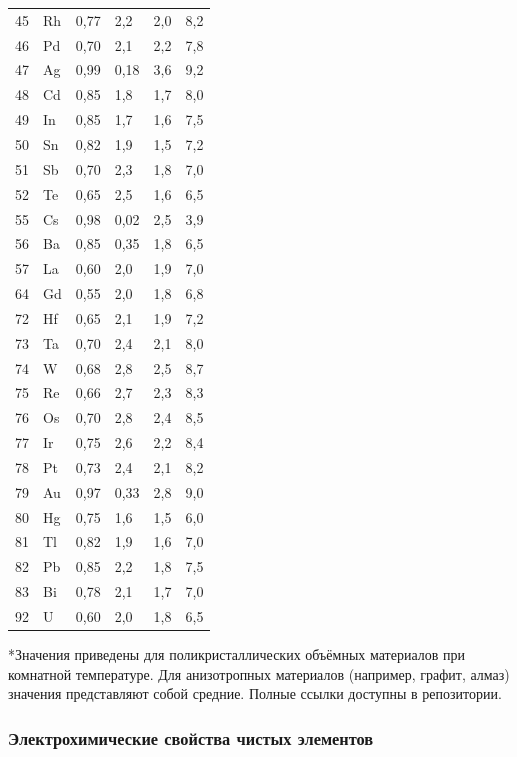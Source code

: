 \documentclass[12pt,a4paper]{article}
\begin{document}
\begin{longtable}{p{0.8cm}p{1.2cm}p{2.2cm}p{2.2cm}p{2.2cm}p{2.2cm}}
		45 & Rh & 0,77 & 2,2 & 2,0 & 8,2 \\
		46 & Pd & 0,70 & 2,1 & 2,2 & 7,8 \\
		47 & Ag & 0,99 & 0,18 & 3,6 & 9,2 \\
		48 & Cd & 0,85 & 1,8 & 1,7 & 8,0 \\
		49 & In & 0,85 & 1,7 & 1,6 & 7,5 \\
		50 & Sn & 0,82 & 1,9 & 1,5 & 7,2 \\
		51 & Sb & 0,70 & 2,3 & 1,8 & 7,0 \\
		52 & Te & 0,65 & 2,5 & 1,6 & 6,5 \\
		55 & Cs & 0,98 & 0,02 & 2,5 & 3,9 \\
		56 & Ba & 0,85 & 0,35 & 1,8 & 6,5 \\
		57 & La & 0,60 & 2,0 & 1,9 & 7,0 \\
		64 & Gd & 0,55 & 2,0 & 1,8 & 6,8 \\
		72 & Hf & 0,65 & 2,1 & 1,9 & 7,2 \\
		73 & Ta & 0,70 & 2,4 & 2,1 & 8,0 \\
		74 & W  & 0,68 & 2,8 & 2,5 & 8,7 \\
		75 & Re & 0,66 & 2,7 & 2,3 & 8,3 \\
		76 & Os & 0,70 & 2,8 & 2,4 & 8,5 \\
		77 & Ir & 0,75 & 2,6 & 2,2 & 8,4 \\
		78 & Pt & 0,73 & 2,4 & 2,1 & 8,2 \\
		79 & Au & 0,97 & 0,33 & 2,8 & 9,0 \\
		80 & Hg & 0,75 & 1,6 & 1,5 & 6,0 \\
		81 & Tl & 0,82 & 1,9 & 1,6 & 7,0 \\
		82 & Pb & 0,85 & 2,2 & 1,8 & 7,5 \\
		83 & Bi & 0,78 & 2,1 & 1,7 & 7,0 \\
		92 & U  & 0,60 & 2,0 & 1,8 & 6,5 \\
		\bottomrule
	\end{longtable}
	*Значения приведены для поликристаллических объёмных материалов при комнатной температуре. Для анизотропных материалов (например, графит, алмаз) значения представляют собой средние. Полные ссылки доступны в репозитории.
	
	\subsubsection{Электрохимические свойства чистых элементов}
	\label{subsec:electrochemical-properties-func}
	
\end{document}
